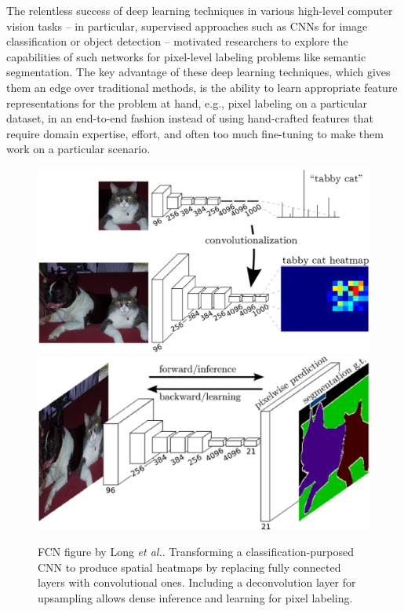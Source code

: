 The relentless success of deep learning techniques in various high-level computer vision tasks -- in particular, supervised approaches such as \acfp{CNN} for image classification or object detection \cite{Krizhevsky2012, Simonyan2014, Szegedy2015} --  motivated researchers to explore the capabilities of such networks for pixel-level labeling problems like semantic segmentation. The key advantage of these deep learning techniques, which gives them an edge over traditional methods, is the ability to learn appropriate feature representations for the problem at hand, e.g., pixel labeling on a particular dataset, in an end-to-end fashion instead of using hand-crafted features that require domain expertise, effort, and often too much fine-tuning to make them work on a particular scenario.

\begin{figure}[!b]
	\centering
	\includegraphics[width=\linewidth]{Figures/Segmentation/convolutionalization.eps}
	\includegraphics[width=0.86\linewidth]{Figures/Segmentation/fcn.eps}
	\caption{\acl{FCN} figure by Long \emph{et al.}\cite{Long2015}. Transforming a classification-purposed \ac{CNN} to produce spatial heatmaps by replacing fully connected layers with convolutional ones. Including a deconvolution layer for upsampling allows dense inference and learning for pixel labeling.}
	\label{fig:convolutionalization}
\end{figure}

